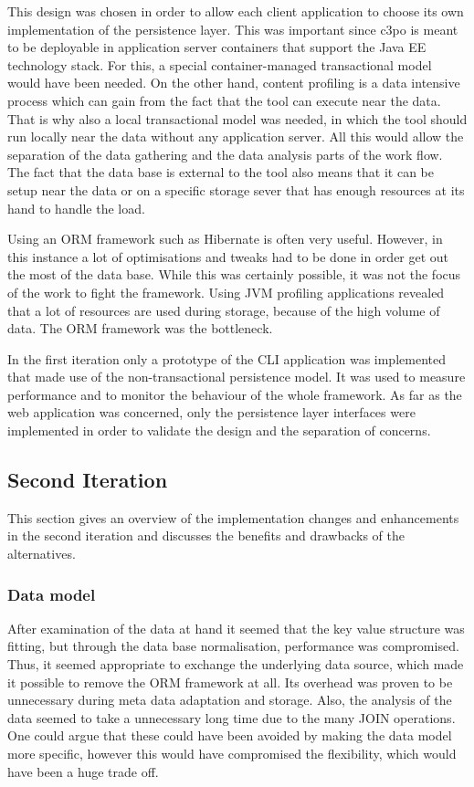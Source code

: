 This design was chosen in order to allow each client application to choose its own implementation of the persistence layer. This was important since c3po is meant to be deployable in application server containers that support the Java EE technology stack. For this, a special container-managed transactional model would have been needed. On the other hand, content profiling is a data intensive process which can gain from the fact that the tool can execute near the data. That is why also a local transactional model was needed, in which the tool should run locally near the data without any application server. All this would allow the separation of the data gathering and the data analysis parts of the work flow. The fact that the data base is external to the tool also means that it can be setup near the data or on a specific storage sever that has enough resources at its hand to handle the load.

Using an ORM framework such as Hibernate is often very useful. However, in this instance a lot of optimisations and tweaks had to be done in order get out the most of the data base. While this was certainly possible, it was not the focus of the work to fight the framework. Using JVM profiling applications revealed that a lot of resources are used during storage, because of the high volume of data. The ORM framework was the bottleneck.

In the first iteration only a prototype of the CLI application was implemented that made use of the non-transactional persistence model. It was used to measure performance and to monitor the behaviour of the whole framework. As far as the web application was concerned, only the persistence layer interfaces were implemented in order to validate the design and the separation of concerns.

\subsection{Second Iteration}
This section gives an overview of the implementation changes and enhancements in the second iteration and discusses the benefits and drawbacks of the alternatives.

\subsubsection{Data model}
After examination of the data at hand it seemed that the key value structure was fitting, but through the data base normalisation, performance was compromised. Thus, it seemed appropriate to exchange the underlying data source, which made it possible to remove the ORM framework at all. Its overhead was proven to be unnecessary during meta data adaptation and storage. Also, the analysis of the data seemed to take a unnecessary long time due to the many JOIN operations. One could argue that these could have been avoided by making the data model more specific, however this would have compromised the flexibility, which would have been a huge trade off.


